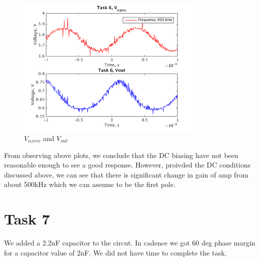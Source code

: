 \documentclass[a4paper,english,11pt]{article}
\begin{document}
\begin{figure}[H]
 \centering
  \includegraphics[width=0.8\textwidth]{img/task6_b_5.png}
  \caption{ $V_{nzero}$ and  $V_{out}$}
  \label{freq5}	
\end{figure}

From observing above plots, we conclude that the DC biasing have not been reasonable enough to see a good response. However, proivded the DC conditions discussed above, we can see that there is significant change in gain of amp from about 500kHz which we can assume to be the first pole. 

\section{Task 7}
We added a 2.2nF capacitor to the circut. In cadence we got 60 deg phase margin for a capacitor value of 2nF. 
We did not have time to complete the task. 
\end{document}
